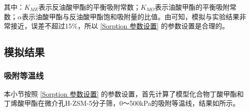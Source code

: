\par{其中：$K_{ME}$表示反油酸甲酯的平衡吸附常数；$K_{MO}$表示油酸甲酯的平衡吸附常数；$\alpha$表示油酸甲酯与反油酸甲酯饱和吸附量的比值。由可知，模拟与实验结果非常接近，误差不超过15\%，所以 \ref{Sorption 参数设置} 的参数设置是合理的。}

\subsection{模拟结果}
\subsubsection{吸附等温线}\label{吸附等温线}
\par{本小节按照 \ref{Sorption 参数设置} 的参数设置，首先计算了模型化合物丁酸甲酯和丁烯酸甲酯在微介孔H-ZSM-5分子筛，0～500kPa的吸附等温线，结果如所示。}

